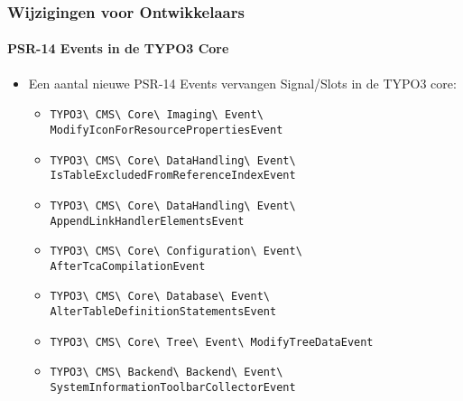 \begin{frame}[fragile]
	\frametitle{Wijzigingen voor Ontwikkelaars}
	\framesubtitle{PSR-14 Events in de TYPO3 Core}

	\begin{itemize}
		\item Een aantal nieuwe PSR-14 Events vervangen Signal/Slots in de TYPO3 core:
			\newline

			\begin{itemize}\tiny
				\item \texttt{TYPO3\textbackslash
					CMS\textbackslash
					Core\textbackslash
					Imaging\textbackslash
					Event\textbackslash
					ModifyIconForResourcePropertiesEvent}
					\newline
				\item \texttt{TYPO3\textbackslash
					CMS\textbackslash
					Core\textbackslash
					DataHandling\textbackslash
					Event\textbackslash
					IsTableExcludedFromReferenceIndexEvent}
					\newline
				\item \texttt{TYPO3\textbackslash
					CMS\textbackslash
					Core\textbackslash
					DataHandling\textbackslash
					Event\textbackslash
					AppendLinkHandlerElementsEvent}
					\newline
				\item \texttt{TYPO3\textbackslash
					CMS\textbackslash
					Core\textbackslash
					Configuration\textbackslash
					Event\textbackslash
					AfterTcaCompilationEvent}
					\newline
				\item \texttt{TYPO3\textbackslash
					CMS\textbackslash
					Core\textbackslash
					Database\textbackslash
					Event\textbackslash
					AlterTableDefinitionStatementsEvent}
					\newline
				\item \texttt{TYPO3\textbackslash
					CMS\textbackslash
					Core\textbackslash
					Tree\textbackslash
					Event\textbackslash
					ModifyTreeDataEvent}
					\newline
				\item \texttt{TYPO3\textbackslash
					CMS\textbackslash
					Backend\textbackslash
					Backend\textbackslash
					Event\textbackslash
					SystemInformationToolbarCollectorEvent}
					\newline
			\end{itemize}

	\end{itemize}

\end{frame}

